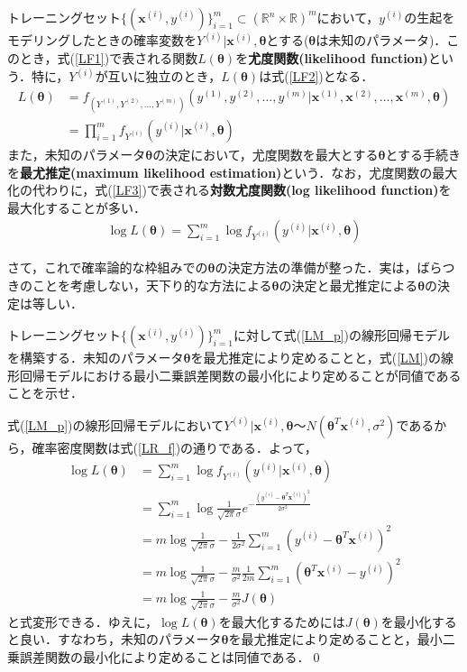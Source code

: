 \begin{defi}
トレーニングセット$\{({\bm x}^{(i)},y^{(i)})\}_{i=1}^m\subset (\mathbb{R}^n \times \mathbb{R})^m$において，$y^{(i)}$の生起をモデリングしたときの確率変数を$Y^{(i)}|{\bm x}^{(i)},{\bm \theta}$とする(${\bm \theta}$は未知のパラメータ)．このとき，式(\ref{LF1})で表される関数$L({\bm \theta})$を{\bf 尤度関数(likelihood function)}という．特に，$Y^{(i)}$が互いに独立のとき，$L({\bm \theta})$は式(\ref{LF2})となる．
\begin{align}
L({\bm \theta})&=f_{(Y^{(1)},Y^{(2)},\ldots,Y^{(m)})}(y^{(1)},y^{(2)},\ldots,y^{(m)}|{\bm x}^{(1)},{\bm x}^{(2)},\ldots,{\bm x}^{(m)},{\bm \theta})\label{LF1}\\
&=\prod_{i=1}^m f_{Y^{(i)}}(y^{(i)}|{\bm x}^{(i)},{\bm \theta})\label{LF2}
\end{align}
また，未知のパラメータ${\bm \theta}$の決定において，尤度関数を最大とする${\bm \theta}$とする手続きを{\bf 最尤推定(maximum likelihood estimation)}という．なお，尤度関数の最大化の代わりに，式(\ref{LF3})で表される{\bf 対数尤度関数(log likelihood function)}を最大化することが多い．
\begin{align}
\log L({\bm \theta})=\sum_{i=1}^m \log f_{Y^{(i)}}(y^{(i)}|{\bm x}^{(i)},{\bm \theta})\label{LF3}
\end{align}
\end{defi}

さて，これで確率論的な枠組みでの${\bm \theta}$の決定方法の準備が整った．実は，ばらつきのことを考慮しない，天下り的な方法による${\bm \theta}$の決定と最尤推定による${\bm \theta}$の決定は等しい．


\begin{qu}
トレーニングセット$\{({\bm x}^{(i)},y^{(i)})\}_{i=1}^m$に対して式(\ref{LM_p})の線形回帰モデルを構築する．未知のパラメータ${\bm \theta}$を最尤推定により定めることと，式(\ref{LM})の線形回帰モデルにおける最小二乗誤差関数の最小化により定めることが同値であることを示せ．
\end{qu}
\begin{ans}
式(\ref{LM_p})の線形回帰モデルにおいて$Y^{(i)}|{\bm x}^{(i)},{\bm \theta}〜N({\bm \theta}^T {\bm x}^{(i)},\sigma^2)$であるから，確率密度関数は式(\ref{LR_f})の通りである．よって，
\begin{align*}
\log L({\bm \theta})&=\sum_{i=1}^m \log f_{Y^{(i)}}(y^{(i)}|{\bm x}^{(i)},{\bm \theta})\\
&=\sum_{i=1}^m \log \frac{1}{\sqrt{2\pi }\sigma}e^{-\frac{(y^{(i)}-{\bm \theta}^T {\bm x}^{(i)})^2}{2\sigma^2}}\\
&= m \log \frac{1}{\sqrt{2\pi }\sigma}-\frac{1}{2\sigma^2}\sum_{i=1}^m(y^{(i)}-{\bm \theta}^T {\bm x}^{(i)})^2\\
&= m \log \frac{1}{\sqrt{2\pi }\sigma}-\frac{m}{\sigma^2}\frac{1}{2m}\sum_{i=1}^m({\bm \theta}^T {\bm x}^{(i)}-y^{(i)})^2\\
&=m \log \frac{1}{\sqrt{2\pi }\sigma}-\frac{m}{\sigma^2}J({\bm \theta})
\end{align*}
と式変形できる．ゆえに，$\log L({\bm \theta})$を最大化するためには$J({\bm \theta})$を最小化すると良い．すなわち，未知のパラメータ${\bm \theta}$を最尤推定により定めることと，最小二乗誤差関数の最小化により定めることは同値である．\qed
\end{ans}


